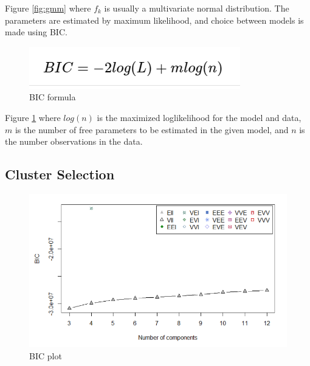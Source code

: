\documentclass[11pt,a4paper,]{article}
\begin{document}
Figure \ref{fig:gmm} where \(f_k\) is usually a multivariate normal distribution. The parameters are estimated by maximum likelihood, and choice between models is made using BIC.

\begin{figure}

{\centering \includegraphics[width=1\linewidth]{image/BIC} 

}

\caption{BIC formula}\label{fig:bic}
\end{figure}

Figure \ref{fig:bic} where \(log(n)\) is the maximized loglikelihood for the model and data, \(m\) is the number of free parameters to be estimated in the given model, and \(n\) is the number observations in the data.

\hypertarget{cluster-selection}{%
\subsection{Cluster Selection}\label{cluster-selection}}

\begin{figure}

{\centering \includegraphics[width=0.7\linewidth]{image/BICplot} 

}

\caption{BIC plot}\label{fig:bicplot}
\end{figure}
\end{document}
